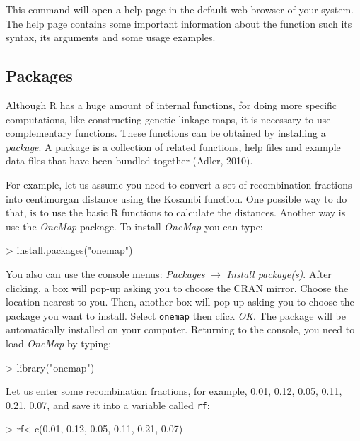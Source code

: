 \documentclass[letterpaper,12pt,oneside]{article}
\begin{document}
This command will open a help page in the default web browser of your system. The help page contains some important information about the function such its syntax, its arguments and some usage examples.  

\subsection{Packages} 
\label{packages}
Although R has a huge amount of internal functions, for doing more specific computations, like constructing genetic linkage maps, it is necessary to use complementary functions. These functions can be obtained by installing a {\it package}. A package is a collection of related functions, help files and example data files that have been bundled together (Adler, 2010). 

For example, let us assume you need to convert a set of recombination fractions into centimorgan distance using the Kosambi function. One possible way to do that, is to use the basic R functions to calculate the distances. Another way is use the {\it OneMap} package. To install {\it OneMap} you can type:

\begin{Schunk}
\begin{Sinput}
> install.packages("onemap")
\end{Sinput}
\end{Schunk}

You also can use the console menus: {\it Packages} $ \rightarrow $ {\it Install package(s)}. After clicking, a box will pop-up asking you to choose the CRAN mirror. Choose the location nearest to you. Then, another box will pop-up asking you to choose the package you want to install. Select {\tt onemap} then click {\it OK}. The package will be automatically installed on your computer. Returning to the console, you need to load {\it OneMap} by typing:

\begin{Schunk}
\begin{Sinput}
> library("onemap")
\end{Sinput}
\end{Schunk}

Let us enter some recombination fractions, for example, 0.01, 0.12, 0.05, 0.11, 0.21, 0.07, and save it into a variable called {\tt rf}:

\begin{Schunk}
\begin{Sinput}
> rf<-c(0.01, 0.12, 0.05, 0.11, 0.21, 0.07)
\end{Sinput}
\end{Schunk}
\end{document}
